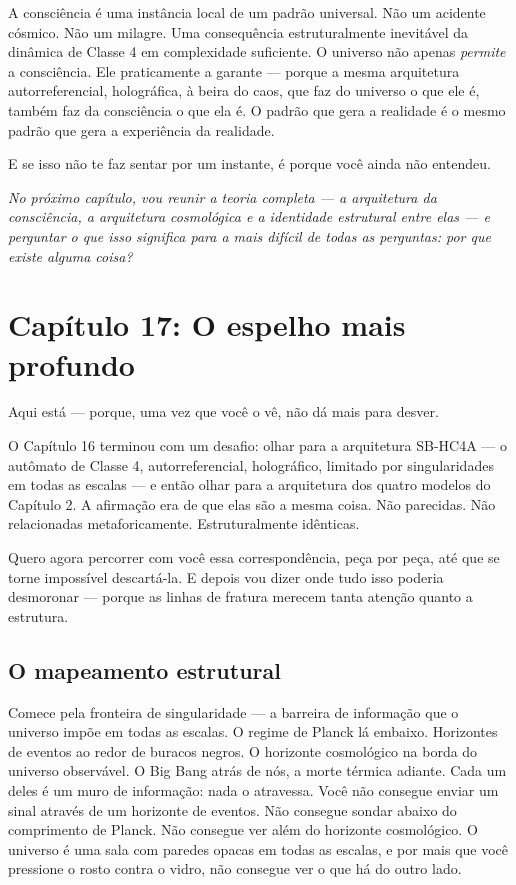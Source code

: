 \documentclass[11pt, twoside, openright]{book}
\begin{document}
A consciência é uma instância local de um padrão universal. Não um acidente cósmico. Não um milagre. Uma consequência estruturalmente inevitável da dinâmica de Classe 4 em complexidade suficiente. O universo não apenas \textit{permite} a consciência. Ele praticamente a garante --- porque a mesma arquitetura autorreferencial, holográfica, à beira do caos, que faz do universo o que ele é, também faz da consciência o que ela é. O padrão que gera a realidade é o mesmo padrão que gera a experiência da realidade.

E se isso não te faz sentar por um instante, é porque você ainda não entendeu.


\textit{No próximo capítulo, vou reunir a teoria completa --- a arquitetura da consciência, a arquitetura cosmológica e a identidade estrutural entre elas --- e perguntar o que isso significa para a mais difícil de todas as perguntas: por que existe alguma coisa?}


\chapter*{Capítulo 17: O espelho mais profundo}

Aqui está --- porque, uma vez que você o vê, não dá mais para desver.

O Capítulo 16 terminou com um desafio: olhar para a arquitetura SB-HC4A --- o autômato de Classe 4, autorreferencial, holográfico, limitado por singularidades em todas as escalas --- e então olhar para a arquitetura dos quatro modelos do Capítulo 2. A afirmação era de que elas são a mesma coisa. Não parecidas. Não relacionadas metaforicamente. Estruturalmente idênticas.

Quero agora percorrer com você essa correspondência, peça por peça, até que se torne impossível descartá-la. E depois vou dizer onde tudo isso poderia desmoronar --- porque as linhas de fratura merecem tanta atenção quanto a estrutura.

\section*{O mapeamento estrutural}

Comece pela fronteira de singularidade --- a barreira de informação que o universo impõe em todas as escalas. O regime de Planck lá embaixo. Horizontes de eventos ao redor de buracos negros. O horizonte cosmológico na borda do universo observável. O Big Bang atrás de nós, a morte térmica adiante. Cada um deles é um muro de informação: nada o atravessa. Você não consegue enviar um sinal através de um horizonte de eventos. Não consegue sondar abaixo do comprimento de Planck. Não consegue ver além do horizonte cosmológico. O universo é uma sala com paredes opacas em todas as escalas, e por mais que você pressione o rosto contra o vidro, não consegue ver o que há do outro lado.
\end{document}
